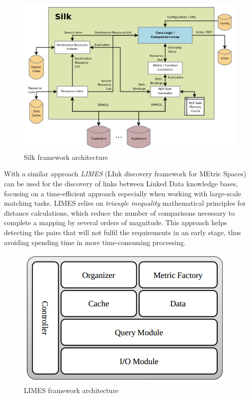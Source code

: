 \begin{figure}
    \center
    \includegraphics[width=\textwidth]{img/ld_approach/silk.png}
    \caption{Silk framework architecture}
\end{figure}

With a similar approach \textit{LIMES} (LInk discovery framework for MEtric Spaces) \cite{ngomo2011limes} can be used for the discovery of links between Linked Data knowledge bases, focusing on a time-efficient approach especially when working with large-scale matching tasks. LIMES relies on \textit{triangle inequality} mathematical principles for distance calculations, which reduce the number of comparisons necessary to complete a mapping by several orders of magnitude. This approach helps detecting the pairs that will not fulfil the requirements in an early stage, thus avoiding spending time in more time-consuming processing.

\begin{figure}
    \center
    \includegraphics[width=\textwidth]{img/ld_approach/limes.png}
    \caption{LIMES framework architecture}
\end{figure}

